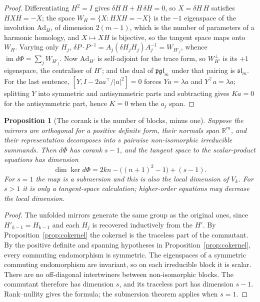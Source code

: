 \documentclass[11pt,a4paper]{article}
\theoremstyle{plain}
\newtheorem{proposition}[theorem]{Proposition}
\theoremstyle{definition}
\theoremstyle{remark}
\begin{document}
\begin{proof}
Differentiating $H^2=I$ gives $\delta H\,H+H\,\delta H=0$, so $X=\delta H\,H$
satisfies $HXH=-X$; the space $W_H=\{X:HXH=-X\}$ is the $-1$ eigenspace of the
involution $\mathrm{Ad}_H$, of dimension $2(m-1)$, which is the number of parameters
of a harmonic homology, and $X\mapsto XH$ is bijective, so the tangent space maps
onto $W_H$. Varying only $H_j$,
$\delta P\cdot P^{-1}=A_j(\delta H_j H_j)A_j^{-1}=W_{H'_j}$, whence
$\operatorname{im}d\Phi=\sum_jW_{H'_j}$. Now $\mathrm{Ad}_{H'}$ is self-adjoint for
the trace form, so $W_{H'}^{\perp}$ is its $+1$ eigenspace, the centraliser of $H'$;
and the dual of $\mathfrak{pgl}_m$ under that pairing is $\mathfrak{sl}_m$. For the
last sentence, $[Y,I-2aa^{\top}/|a|^2]=0$ forces $Ya=\lambda a$ and
$Y^{\top}a=\lambda a$; splitting $Y$ into symmetric and antisymmetric parts and
subtracting gives $Ka=0$ for the antisymmetric part, hence $K=0$ when the $a_j$ span.
\end{proof}

\begin{proposition}[The corank is the number of blocks, minus one]\label{prop:corank}
Suppose the mirrors are orthogonal for a positive definite form, their
normals span $\mathbb R^m$, and their representation decomposes into $s$
pairwise non-isomorphic irreducible summands. Then $d\Phi$ has corank $s-1$,
and the tangent space to the scalar-product equations has dimension
\[
  \dim\ker d\Phi=2kn-\bigl((n+1)^2-1\bigr)+(s-1).
\]
For $s=1$ the map is a submersion and this is also the local dimension of
$V_k$. For $s>1$ it is only a tangent-space calculation; higher-order
equations may decrease the local dimension.
\end{proposition}

\begin{proof}
The unfolded mirrors generate the same group as the original ones, since
$H'_{k-1}=H_{k-1}$ and each $H_j$ is recovered inductively from the $H'$. By
Proposition~\ref{prop:cokernel} the cokernel is the traceless part of the commutant.
By the positive definite and spanning hypotheses in
Proposition~\ref{prop:cokernel}, every commuting endomorphism is symmetric.
The eigenspaces of a symmetric commuting endomorphism are invariant, so on
each irreducible block it is scalar. There are no off-diagonal intertwiners
between non-isomorphic blocks. The commutant therefore has dimension $s$,
and its traceless part has dimension $s-1$. Rank--nullity gives the formula;
the submersion theorem applies when $s=1$.
\end{proof}
\end{document}
